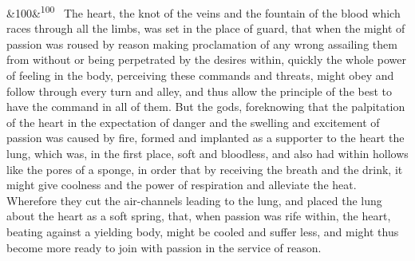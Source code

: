 \documentclass[12pt]{article}
\newcommand{\para}[1][]{\par\noindent\ifx&#1&\else\textsuperscript{\footnotesize #1}~\fi}
\begin{document}
\para[100] The heart, the knot of the veins and the fountain of the blood which races through all the limbs, was set in the place of guard, that when the might of passion was roused by reason making proclamation of any wrong assailing them from without or being perpetrated by the desires within, quickly the whole power of feeling in the body, perceiving these commands and threats, might obey and follow through every turn and alley, and thus allow the principle of the best to have the command in all of them. But the gods, foreknowing that the palpitation of the heart in the expectation of danger and the swelling and excitement of passion was caused by fire, formed and implanted as a supporter to the heart the lung, which was, in the first place, soft and bloodless, and also had within hollows like the pores of a sponge, in order that by receiving the breath and the drink, it might give coolness and the power of respiration and alleviate the heat. Wherefore they cut the air-channels leading to the lung, and placed the lung about the heart as a soft spring, that, when passion was rife within, the heart, beating against a yielding body, might be cooled and suffer less, and might thus become more ready to join with passion in the service of reason.
\end{document}
